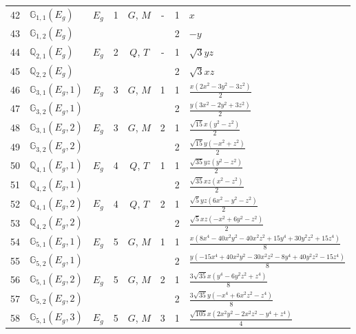 \documentclass[fleqn,10pt,landscape]{jsarticle}
\begin{document}
\begin{longtable}[l]{clcccccl}
42 & $\mathbb{G}_{1,1}(E_{g})$ & $E_{g}$ & 1 & $G$, $M$ & - & 1 & $x$ \\
43 & $\mathbb{G}_{1,2}(E_{g})$ &  &  &  &  & 2 & $- y$ \\ \hline
44 & $\mathbb{Q}_{2,1}(E_{g})$ & $E_{g}$ & 2 & $Q$, $T$ & - & 1 & $\sqrt{3} y z$ \\
45 & $\mathbb{Q}_{2,2}(E_{g})$ &  &  &  &  & 2 & $\sqrt{3} x z$ \\ \hline
46 & $\mathbb{G}_{3,1}(E_{g},1)$ & $E_{g}$ & 3 & $G$, $M$ & 1 & 1 & $\frac{x \left(2 x^{2} - 3 y^{2} - 3 z^{2}\right)}{2}$ \\
47 & $\mathbb{G}_{3,2}(E_{g},1)$ &  &  &  &  & 2 & $\frac{y \left(3 x^{2} - 2 y^{2} + 3 z^{2}\right)}{2}$ \\ \hline
48 & $\mathbb{G}_{3,1}(E_{g},2)$ & $E_{g}$ & 3 & $G$, $M$ & 2 & 1 & $\frac{\sqrt{15} x \left(y^{2} - z^{2}\right)}{2}$ \\
49 & $\mathbb{G}_{3,2}(E_{g},2)$ &  &  &  &  & 2 & $\frac{\sqrt{15} y \left(- x^{2} + z^{2}\right)}{2}$ \\ \hline
50 & $\mathbb{Q}_{4,1}(E_{g},1)$ & $E_{g}$ & 4 & $Q$, $T$ & 1 & 1 & $\frac{\sqrt{35} y z \left(y^{2} - z^{2}\right)}{2}$ \\
51 & $\mathbb{Q}_{4,2}(E_{g},1)$ &  &  &  &  & 2 & $\frac{\sqrt{35} x z \left(x^{2} - z^{2}\right)}{2}$ \\ \hline
52 & $\mathbb{Q}_{4,1}(E_{g},2)$ & $E_{g}$ & 4 & $Q$, $T$ & 2 & 1 & $\frac{\sqrt{5} y z \left(6 x^{2} - y^{2} - z^{2}\right)}{2}$ \\
53 & $\mathbb{Q}_{4,2}(E_{g},2)$ &  &  &  &  & 2 & $\frac{\sqrt{5} x z \left(- x^{2} + 6 y^{2} - z^{2}\right)}{2}$ \\ \hline
54 & $\mathbb{G}_{5,1}(E_{g},1)$ & $E_{g}$ & 5 & $G$, $M$ & 1 & 1 & $\frac{x \left(8 x^{4} - 40 x^{2} y^{2} - 40 x^{2} z^{2} + 15 y^{4} + 30 y^{2} z^{2} + 15 z^{4}\right)}{8}$ \\
55 & $\mathbb{G}_{5,2}(E_{g},1)$ &  &  &  &  & 2 & $\frac{y \left(- 15 x^{4} + 40 x^{2} y^{2} - 30 x^{2} z^{2} - 8 y^{4} + 40 y^{2} z^{2} - 15 z^{4}\right)}{8}$ \\ \hline
56 & $\mathbb{G}_{5,1}(E_{g},2)$ & $E_{g}$ & 5 & $G$, $M$ & 2 & 1 & $\frac{3 \sqrt{35} x \left(y^{4} - 6 y^{2} z^{2} + z^{4}\right)}{8}$ \\
57 & $\mathbb{G}_{5,2}(E_{g},2)$ &  &  &  &  & 2 & $\frac{3 \sqrt{35} y \left(- x^{4} + 6 x^{2} z^{2} - z^{4}\right)}{8}$ \\ \hline
58 & $\mathbb{G}_{5,1}(E_{g},3)$ & $E_{g}$ & 5 & $G$, $M$ & 3 & 1 & $\frac{\sqrt{105} x \left(2 x^{2} y^{2} - 2 x^{2} z^{2} - y^{4} + z^{4}\right)}{4}$ \\

\end{longtable}
\end{document}
